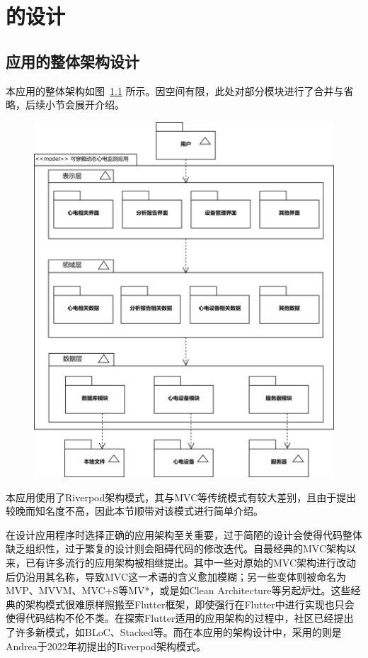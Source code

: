 

\chapter{\app 的设计}\label{ch:design}


\section{应用的整体架构设计}\label{sec:arch-design}

本应用的整体架构如图~\ref{fig:model} 所示。因空间有限，此处对部分模块进行了合并与省略，后续小节会展开介绍。

\begin{figure}[ht]
    \centering
    \includegraphics[width=.9\textwidth]{../assets/model.drawio}
    \label{fig:model}
\end{figure}

本应用使用了Riverpod架构模式\cite{bizzottoFlutterAppArchitecture}，其与MVC等传统模式有较大差别，且由于提出较晚而知名度不高，因此本节顺带对该模式进行简单介绍。

在设计应用程序时选择正确的应用架构至关重要，过于简陋的设计会使得代码整体缺乏组织性，过于繁复的设计则会阻碍代码的修改迭代。自最经典的MVC架构以来，已有许多流行的应用架构被相继提出。其中一些对原始的MVC架构进行改动后仍沿用其名称，导致MVC这一术语的含义愈加模糊；另一些变体则被命名为MVP、MVVM、MVC+S等MV*，或是如Clean Architecture等另起炉灶。这些经典的架构模式很难原样照搬至Flutter框架，即使强行在Flutter中进行实现也只会使得代码结构不伦不类。在探索Flutter适用的应用架构的过程中，社区已经提出了许多新模式，如BLoC、Stacked等。而在本应用的架构设计中，采用的则是Andrea于2022年初提出的Riverpod架构模式。


